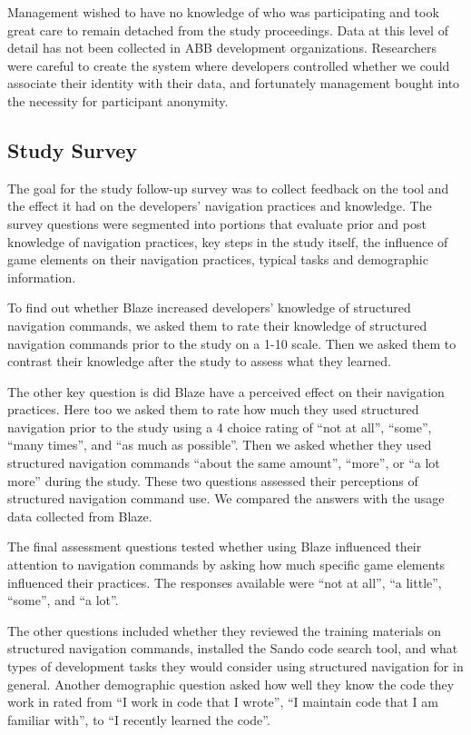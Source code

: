 \documentclass{sig-alternate}
\begin{document}
Management wished to have no knowledge of who was participating and took great care to remain detached from the study proceedings.  Data at this level of detail has not been collected in ABB development organizations.  Researchers were careful to create the system where developers controlled whether we could associate their identity with their data, and fortunately management bought into the necessity for participant anonymity.

\subsection{Study Survey}

The goal for the study follow-up survey was to collect feedback on the tool and the effect it had on the developers' navigation practices and knowledge.  The survey questions were segmented into portions that evaluate prior and post knowledge of navigation practices, key steps in the study itself, the influence of game elements on their navigation practices, typical tasks and demographic information.

To find out whether Blaze increased developers'  knowledge of structured navigation commands, we asked them to rate their knowledge of structured navigation commands prior to the study on a 1-10 scale.  Then we asked them to contrast their knowledge after the study to assess what they learned.

The other key question is did Blaze have a perceived effect on their navigation practices.  Here too we asked them to rate how much they used structured navigation prior to the study using a 4 choice rating of ``not at all'', ``some'', ``many times'', and ``as much as possible''.  Then we asked whether they used structured navigation commands ``about the same amount'', ``more'',  or ``a lot more'' during the study.  These two questions assessed their perceptions of structured navigation command use.  We compared the answers with the usage data collected from Blaze.

The final assessment questions tested whether using Blaze influenced their attention to navigation commands by asking how much specific game elements influenced their practices.  The responses available were ``not at all'', ``a little'', ``some'', and ``a lot''.  

The other questions included whether they reviewed the training materials on structured navigation commands, installed the Sando code search tool, and what types of development tasks they would consider using structured navigation for in general.  Another demographic question asked how well they know the code they work in rated from ``I work in code that I wrote'', ``I maintain code that I am familiar with'', to ``I recently learned the code''.
\end{document}
